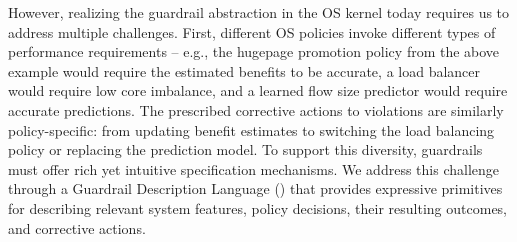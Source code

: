 However, realizing the guardrail abstraction in the OS kernel today requires us to address multiple challenges. First, different OS policies invoke different types of performance requirements – e.g., the hugepage promotion policy from the above example would require the estimated benefits to be accurate, a load balancer would require low core imbalance, and a learned flow size predictor would require accurate predictions.
The prescribed corrective actions to violations are similarly policy-specific: from updating benefit estimates to switching the load balancing policy or replacing the prediction model.
To support this diversity, guardrails must offer rich yet intuitive specification mechanisms. We address this challenge through a Guardrail Description Language (\lang) that provides expressive primitives for describing relevant system features, policy decisions, their resulting outcomes, and corrective actions.

